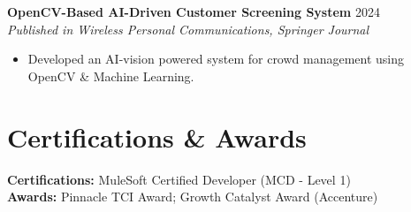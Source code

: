\documentclass[letterpaper,10pt]{article}
\begin{document}
\textbf{OpenCV-Based AI-Driven Customer Screening System} \hfill 2024 \\
\textit{Published in Wireless Personal Communications, Springer Journal}
\begin{itemize}[leftmargin=*,noitemsep,topsep=-2pt]
    \item Developed an AI-vision powered system for crowd management using OpenCV \& Machine Learning.
\end{itemize}

\section*{Certifications \& Awards}
\textbf{Certifications:} MuleSoft Certified Developer (MCD - Level 1) \\
\textbf{Awards:} Pinnacle TCI Award; Growth Catalyst Award (Accenture)
\end{document}
